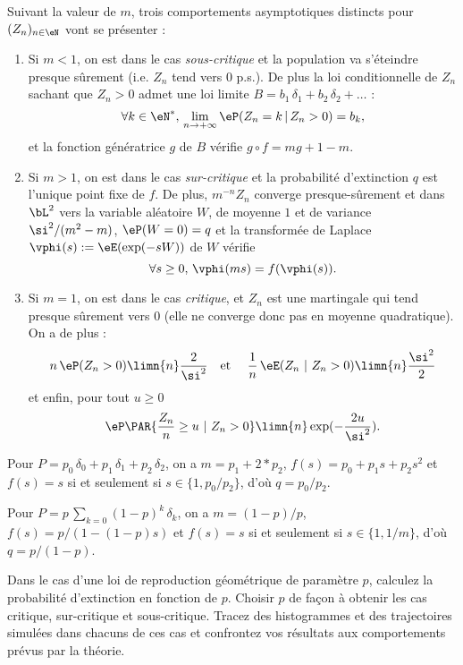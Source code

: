 Suivant la valeur de $m$, trois comportements asymptotiques distincts pour
$(Z_n)_{n\in\eN}$ vont se présenter :
\begin{enumerate}
\item Si $m<1$, on est dans le cas \emph{sous-critique} et la population va
  s'éteindre presque sûrement (i.e. $Z_n$ tend vers $0$ p.s.). De plus la loi
  conditionnelle de $Z_n$ sachant que $Z_n>0$ admet une loi limite
  $B=b_1\,\delta_1+b_2\,\delta_2+\ldots$ :
  $$
  \forall k\in\eN^*,\,\lim_{n\to+\infty} \eP(Z_n=k\,\vert\,Z_n>0) = b_k,
  $$
  et la fonction génératrice $g$ de $B$ vérifie $g\circ f=mg+1-m$.
\item Si $m >1$, on est dans le cas \emph{sur-critique} et la probabilité
  d'extinction $q$ est l'unique point fixe de $f$.  De plus, $m^{-n} Z_n$
  converge presque-sûrement et dans $\bL^2$ vers la variable aléatoire $W$, de
  moyenne $1$ et de variance $\si^2/(m^2-m)$, $\eP(W=0)=q$ et la transformée
  de Laplace $\vphi(s):=\eE(\exp(-sW))$ de $W$ vérifie
  $$
  \forall s\geq 0,\,\vphi(ms)=f(\vphi(s)).
  $$
\item Si $m =1$, on est dans le cas \emph{critique}, et $Z_n$ est une
  martingale qui tend presque sûrement vers $0$ (elle ne converge donc pas en
  moyenne quadratique). On a de plus :
  $$
   n\,\eP(Z_n>0) \limn{n} \frac{2}{\si^2}
   \text{\quad et \quad} 
   \frac{1}{n}\,\eE(Z_n\ |\ Z_n>0) \limn{n} \frac{\si^2}{2}
   $$
   et enfin, pour tout $u\geq 0$
  $$
  \eP\PAR{\frac{Z_n}{n} \geq u\ |\ Z_n>0} \limn{n} \exp(-\frac{2u}{\si^2}).
  $$
\end{enumerate}

Pour $P=p_0\,\delta_0+p_1\,\delta_1+p_2\,\delta_2$, on a $m=p_1+2*p_2$,
$f(s)=p_0+p_1s+p_2s^2$ et $f(s)=s$ si et seulement si
$s\in\{1,p_0/p_2\}$, d'où $q=p_0/p_2$.

%
%

Pour $P=p\,\sum_{k=0} (1-p)^k\,\delta_k$, on a $m=(1-p)/p$,
$f(s)=p/(1-(1-p)s)$ et $f(s)=s$ si et seulement si $s\in\{1,1/m\}$,
d'où $q=p/(1-p)$.

%
%

%
%

%
%

%
%

\begin{exo}
Dans le cas d'une loi de reproduction géométrique de paramètre $p$,
calculez la probabilité d'extinction en fonction de $p$. Choisir $p$
de façon à obtenir les cas critique, sur-critique et sous-critique.
Tracez des histogrammes et des trajectoires simulées dans chacuns de
ces cas et confrontez vos résultats aux comportements prévus par la
théorie.
\end{exo}


